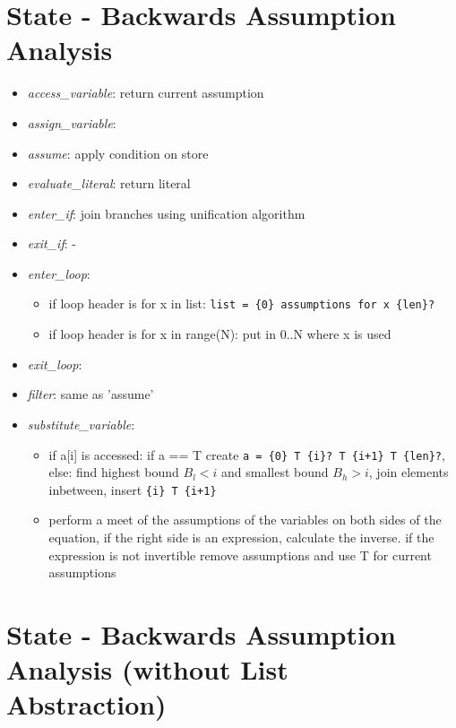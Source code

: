 \documentclass[11pt]{article}
\begin{document}
\section{State - Backwards Assumption Analysis}

\begin{itemize}
\item \textit{access\_variable}: return current assumption
\item \textit{assign\_variable}:
\item \textit{assume}: apply condition on store
\item \textit{evaluate\_literal}: return literal
\item \textit{enter\_if}: join branches using unification algorithm
\item \textit{exit\_if}: -
\item \textit{enter\_loop}:
\begin{itemize}
\item if loop header is for x in list: \verb|list = {0} assumptions for x {len}?|
\item if loop header is for x in range(N): put in 0..N where x is used
\end{itemize}
\item \textit{exit\_loop}:
\item \textit{filter}: same as 'assume'
\item \textit{substitute\_variable}:
\begin{itemize}
\item if a[i] is accessed: if a == T create \verb|a = {0} T {i}? T {i+1} T {len}?|, else: find highest bound $B_l < i$ and smallest bound $B_h > i$, join elements inbetween, insert \verb|{i} T {i+1}|
\item perform a meet of the assumptions of the variables on both sides of the equation, if the right side is an expression, calculate the inverse. if the expression is not invertible remove assumptions and use T for current assumptions
\end{itemize}
\end{itemize}


\section{State - Backwards Assumption Analysis (without List Abstraction)}
\end{document}
